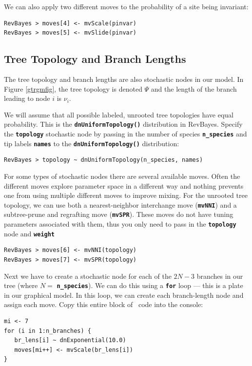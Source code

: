 \documentclass[11pt]{article}
\newcommand{\cl}[1]{{\texttt{\textbf{#1}}}}
\begin{document}
We can also apply two different moves to the probability of a site being invariant:
{\tt \begin{snugshade*}
\begin{lstlisting}
RevBayes > moves[4] <- mvScale(pinvar)
RevBayes > moves[5] <- mvSlide(pinvar)
\end{lstlisting}
\end{snugshade*}}

\subsection*{Tree Topology and Branch Lengths}

The tree topology and branch lengths are also stochastic nodes in our model. 
In Figure \ref{gtrgmfig}, the tree topology is denoted $\Psi$ and the length of the branch leading to node $i$ is $\nu_i$.

We will assume that all possible labeled, unrooted tree topologies have equal probability. This is the \cl{dnUniformTopology()} distribution in RevBayes. Specify the \cl{topology} stochastic node by passing in the number of species \cl{n\_species} and tip labels \cl{names} to the \cl{dnUniformTopology()} distribution:
{\tt \begin{snugshade*}
\begin{lstlisting}
RevBayes > topology ~ dnUniformTopology(n_species, names)
\end{lstlisting}
\end{snugshade*}}

For some types of stochastic nodes there are several available moves. 
Often the different moves explore parameter space in a different way and nothing prevents one from using multiple different moves to improve mixing. 
For the unrooted tree topology, we can use both a nearest-neighbor interchange move (\cl{mvNNI}) and a subtree-prune and regrafting move (\cl{mvSPR}). These moves do not have tuning parameters associated with them, thus you only need to pass in the \cl{topology} node and \cl{weight} 
{\tt \begin{snugshade*}
\begin{lstlisting}
RevBayes > moves[6] <- mvNNI(topology)
RevBayes > moves[7] <- mvSPR(topology)
\end{lstlisting}
\end{snugshade*}}


Next we have to create a stochastic node for each of the $2N-3$ branches in our tree (where $N=$ \cl{n\_species}). 
We can do this using a \cl{for} loop --- this is a plate in our graphical model. In this loop, we can create each branch-length node and assign each move. Copy this entire block of \Rev~code into the console:
{\tt \small \begin{snugshade*}
\begin{lstlisting}
mi <- 7
for (i in 1:n_branches) {
   br_lens[i] ~ dnExponential(10.0)
   moves[mi++] <- mvScale(br_lens[i]) 
}
\end{lstlisting}
\end{snugshade*}}
\end{document}
